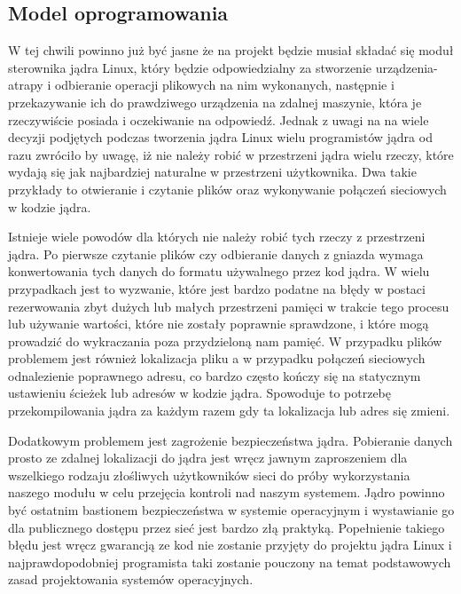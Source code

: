 \documentclass[10pt]{article}
\begin{document}
\subsection{Model oprogramowania}
\label{softmodel}

W tej chwili powinno już być jasne że na projekt będzie musiał składać
się moduł sterownika jądra Linux, który będzie odpowiedzialny za
stworzenie urządzenia-atrapy i odbieranie operacji plikowych na nim
wykonanych, następnie i przekazywanie ich do prawdziwego urządzenia na
zdalnej maszynie, która je rzeczywiście posiada i oczekiwanie na
odpowiedź. Jednak z uwagi na na wiele decyzji podjętych podczas
tworzenia jądra Linux wielu programistów jądra od razu zwróciło by
uwagę, iż nie należy robić w przestrzeni jądra wielu rzeczy, które
wydają się jak najbardziej naturalne w przestrzeni użytkownika. Dwa
takie przykłady to otwieranie i czytanie plików oraz wykonywanie
połączeń sieciowych w kodzie jądra.

Istnieje wiele powodów dla których nie należy robić tych rzeczy z
przestrzeni jądra. Po pierwsze czytanie plików czy odbieranie danych z
gniazda wymaga konwertowania tych danych do formatu używalnego przez kod
jądra. W wielu przypadkach jest to wyzwanie, które jest bardzo podatne
na błędy w postaci rezerwowania zbyt dużych lub małych przestrzeni
pamięci w trakcie tego procesu lub używanie wartości, które nie zostały
poprawnie sprawdzone, i które mogą prowadzić do wykraczania poza
przydzieloną nam pamięć. W przypadku plików problemem jest również
lokalizacja pliku a w przypadku połączeń sieciowych odnalezienie
poprawnego adresu, co bardzo często kończy się na statycznym ustawieniu
ścieżek lub adresów w kodzie jądra. Spowoduje to potrzebę
przekompilowania jądra za każdym razem gdy ta lokalizacja lub adres się
zmieni.

Dodatkowym problemem jest zagrożenie bezpieczeństwa jądra. Pobieranie
danych prosto ze zdalnej lokalizacji do jądra jest wręcz jawnym
zaproszeniem dla wszelkiego rodzaju złośliwych użytkowników sieci do
próby wykorzystania naszego modułu w celu przejęcia kontroli nad naszym
systemem. Jądro powinno być ostatnim bastionem bezpieczeństwa w systemie
operacyjnym i wystawianie go dla publicznego dostępu przez sieć jest
bardzo złą praktyką. Popełnienie takiego błędu jest wręcz gwarancją ze
kod nie zostanie przyjęty do projektu jądra Linux i najprawdopodobniej
programista taki zostanie pouczony na temat podstawowych zasad
projektowania systemów operacyjnych.
\end{document}
